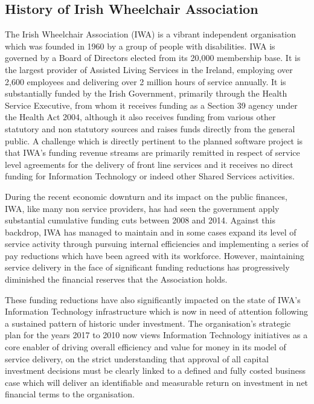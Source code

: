 \documentclass[a4paper,Times New Roman 11pt]{article}
\begin{document}
\begin{samepage}
\subsection {History of Irish Wheelchair Association}
The Irish Wheelchair Association (IWA) is a vibrant  independent organisation which was founded in 1960 by a group of people with disabilities. IWA is governed by a Board of Directors elected from its 20,000 membership base. It is the largest provider of Assisted Living Services in the Ireland, employing over 2,600 employees and delivering over 2 million hours of service annually. It is substantially funded by the Irish Government, primarily through the Health Service Executive, from whom it receives funding as a Section 39 agency under the Health Act 2004, although it also receives funding from various other statutory and non statutory sources and raises funds directly from the general public. A challenge which is directly pertinent to the planned software project is that IWA's funding revenue streams are primarily remitted in respect of service level agreements for the delivery of front line services and it receives no direct funding for Information Technology or indeed other Shared Services activities.

During the recent economic downturn and its impact on the public finances, IWA, like many non service providers, has had seen the government apply substantial cumulative funding cuts between 2008 and 2014. Against this backdrop, IWA has managed to maintain and in some cases expand its level of service activity through pursuing internal efficiencies and implementing a series of pay reductions which have been agreed with its workforce. However, maintaining service delivery in the face of significant funding reductions has progressively diminished the financial reserves that the Association holds. 

These funding reductions have also significantly impacted on the state of IWA's Information Technology infrastructure which is now in need of attention following a sustained pattern of historic under investment. The organisation's strategic plan for the years 2017 to 2010 now views Information Technology initiatives as a core enabler of driving overall efficiency and value for money in its model of service delivery, on the strict understanding that approval of all capital investment decisions must be clearly linked to a defined and fully costed business case which will deliver an identifiable and measurable return on investment in net financial terms to the organisation. 


\end{samepage}
\end{document}

